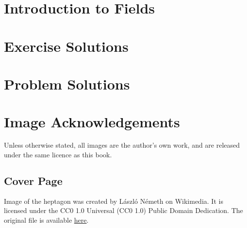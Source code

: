
\usepackage{xr}

\newcommand{\version}{0.1}
\newcommand{\volumenumber}{3}
\newcommand{\volumename}{Fields}
\newcommand{\volumeimage}{cover/Regular-Heptagon.png}

\newcommand{\quotepagetext}{
    I became convinced that studying the algebraic relationship of numbers is most conveniently based on a concept that is directly connected with the simplest arithmetic properties. I had originally used the term ``rational domain'', which I later changed to ``field''.
}
\newcommand{\quotepageattribution}{Richard Dedekind, 1871}
\newcommand{\quotepagecitation}{\cite[p.~66]{kleiner_2007}}

\newcommand{\prefacevolumetext}{
    We cover field theory essentials in Volume III. %
}

\linespread{1.05}




\frontmatterpages  %

\chapter{Introduction to Fields}

\appendix
\chapter{Exercise Solutions}

\chapter{Problem Solutions}

\chapter{Image Acknowledgements}
Unless otherwise stated, all images are the author's own work, and are released under the same licence as this book.

\section{Cover Page}
Image of the heptagon was created by L\'{a}szl\'{o} N\'{e}meth on Wikimedia. It is licensed under the CC0 1.0 Universal (CC0 1.0) Public Domain Dedication. The original file is available \href{https://commons.wikimedia.org/wiki/File:Regular_polygon_7_annotated.svg}{here}.

\printbibliography[heading=bibintoc, title={References and Bibliography}]


